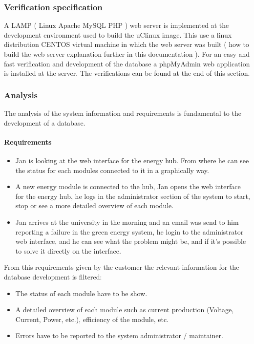 \subsubsection{Verification specification}
A LAMP ( Linux Apache MySQL PHP ) web server is implemented at the development environment used to build the uClinux image. This use a linux distribution CENTOS virtual machine in which the web server was built ( how to build the web server explanation further in this documentation ).
For an easy and fast verification and development of the database a phpMyAdmin web application is installed at the server.
The verifications can be found at the end of this section.

%	
\subsubsection{Analysis}
The analysis of the system information and requirements is fundamental to the development of a database. 
\paragraph{Requirements}
	\begin{itemize}
		\item Jan is looking at the web interface for the energy hub. From where he can see the status for each modules connected to it
in a graphically way.
		\item A new energy module is connected to the hub, Jan opens the web interface for the energy hub, he logs in the administrator section of the system
to start, stop or see a more detailed overview of each module.
		\item Jan arrives at the university in the morning and an email was send to him reporting a failure in the green energy system, he login to the administrator web interface, and he can see what the problem might be, and if it's possible to solve it directly on the interface.
	\end{itemize}

From this requirements given by the customer the relevant information for the database development is filtered:
	\begin{itemize}
		\item The status of each module have to be show.
		\item A detailed overview of each module such as current production (Voltage, Current, Power, etc.), efficiency of the module, etc.
		\item Errors have to be reported to the system administrator / maintainer.
	\end{itemize}
	
